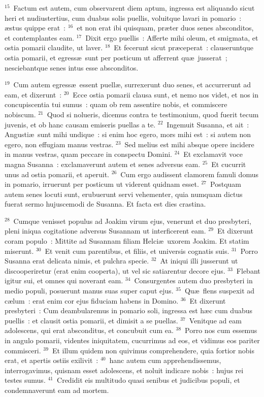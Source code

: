 ${}^{15}$~Factum est autem, cum observarent diem aptum, ingressa est aliquando sicut heri et nudiustertius, cum duabus solis puellis, voluitque lavari in pomario~: \ae stus quippe erat~:
${}^{16}$~et non erat ibi quisquam, pr\ae ter duos senes absconditos, et contemplantes eam.
${}^{17}$~Dixit ergo puellis~: Afferte mihi oleum, et smigmata, et ostia pomarii claudite, ut laver.
${}^{18}$~Et fecerunt sicut pr\ae ceperat~: clauseruntque ostia pomarii, et egress\ae\ sunt per posticum ut afferrent qu\ae\ jusserat~; nesciebantque senes intus esse absconditos.


${}^{19}$~Cum autem egress\ae\ essent puell\ae , surrexerunt duo senes, et accurrerunt ad eam, et dixerunt~:
${}^{20}$~Ecce ostia pomarii clausa sunt, et nemo nos videt, et nos in concupiscentia tui sumus~: quam ob rem assentire nobis, et commiscere nobiscum.
${}^{21}$~Quod si nolueris, dicemus contra te testimonium, quod fuerit tecum juvenis, et ob hanc causam emiseris puellas a te.
${}^{22}$~Ingemuit Susanna, et ait~: Angusti\ae\ sunt mihi undique~: si enim hoc egero, mors mihi est~: si autem non egero, non effugiam manus vestras.
${}^{23}$~Sed melius est mihi absque opere incidere in manus vestras, quam peccare in conspectu Domini.
${}^{24}$~Et exclamavit voce magna Susanna~: exclamaverunt autem et senes adversus eam.
${}^{25}$~Et cucurrit unus ad ostia pomarii, et aperuit.
${}^{26}$~Cum ergo audissent clamorem famuli domus in pomario, irruerunt per posticum ut viderent quidnam esset.
${}^{27}$~Postquam autem senes locuti sunt, erubuerunt servi vehementer, quia numquam dictus fuerat sermo hujuscemodi de Susanna. Et facta est dies crastina.


${}^{28}$~Cumque venisset populus ad Joakim virum ejus, venerunt et duo presbyteri, pleni iniqua cogitatione adversus Susannam ut interficerent eam.
${}^{29}$~Et dixerunt coram populo~: Mittite ad Susannam filiam Helci\ae\ uxorem Joakim. Et statim miserunt.
${}^{30}$~Et venit cum parentibus, et filiis, et universis cognatis suis.
${}^{31}$~Porro Susanna erat delicata nimis, et pulchra specie.
${}^{32}$~At iniqui illi jusserunt ut discooperiretur (erat enim cooperta), ut vel sic satiarentur decore ejus.
${}^{33}$~Flebant igitur sui, et omnes qui noverant eam.
${}^{34}$~Consurgentes autem duo presbyteri in medio populi, posuerunt manus suas super caput ejus.
${}^{35}$~Qu\ae\ flens suspexit ad c\ae lum~: erat enim cor ejus fiduciam habens in Domino.
${}^{36}$~Et dixerunt presbyteri~: Cum deambularemus in pomario soli, ingressa est h\ae c cum duabus puellis~: et clausit ostia pomarii, et dimisit a se puellas.
${}^{37}$~Venitque ad eam adolescens, qui erat absconditus, et concubuit cum ea.
${}^{38}$~Porro nos cum essemus in angulo pomarii, videntes iniquitatem, cucurrimus ad eos, et vidimus eos pariter commisceri.
${}^{39}$~Et illum quidem non quivimus comprehendere, quia fortior nobis erat, et apertis ostiis exilivit~:
${}^{40}$~hanc autem cum apprehendissemus, interrogavimus, quisnam esset adolescens, et noluit indicare nobis~: hujus rei testes sumus.
${}^{41}$~Credidit eis multitudo quasi senibus et judicibus populi, et condemnaverunt eam ad mortem.


